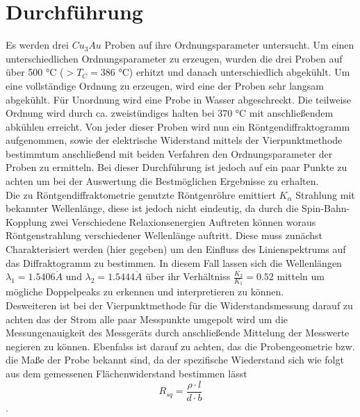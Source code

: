 \section{Durchführung}
    Es werden drei $Cu_3Au$ Proben auf ihre Ordnungsparameter untersucht. Um einen unterschiedlichen
    Ordnungsparameter zu erzeugen, wurden die drei Proben auf über 500 °C ($>T_C = 386 $ °C) erhitzt
    und danach unterschiedlich abgekühlt. Um eine vollständige Ordnung zu erzeugen, wird eine der
    Proben sehr langsam abgekühlt. Für Unordnung wird eine Probe in Wasser abgeschreckt.
    Die teilweise Ordnung wird durch ca. zweistündiges halten bei 370 °C mit anschließendem abkühlen
    erreicht. Von jeder dieser Proben wird nun ein Röntgendiffraktogramm aufgenommen,
    sowie der elektrische Widerstand mittels der Vierpunktmethode bestimmtum anschließend mit beiden Verfahren den
    Ordnungsparameter der Proben zu ermitteln.
    Bei dieser Durchführung ist jedoch auf ein paar Punkte zu achten um bei der Auswertung die Bestmöglichen
    Ergebnisse zu erhalten.\\
    Die zu Röntgendiffraktometrie genutzte Röntgenröhre emittiert $K_{\alpha}$ Strahlung mit bekannter
    Wellenlänge, diese ist jedoch nicht eindeutig, da durch die Spin-Bahn-Kopplung zwei Verschiedene
    Relaxionsenergien Auftreten können woraus Röntgenstrahlung verschiedener Wellenlänge auftritt.
    Diese muss zunächst Charakterisiert werden (hier gegeben) um den Einfluss des Linienspektrums auf
    das Diffraktogramm zu bestimmen. In diesem Fall lassen sich die Wellenlängen $\lambda_1 = 1.5406\mathring{A}$
    und $\lambda_2 = 1.5444\mathring{A}$ über ihr Verhältniss $\frac{K_2}{K_1} = 0.52$ mitteln um mögliche Doppelpeaks
    zu erkennen und interpretieren zu können.\\
    Desweiteren ist bei der Vierpunktmethode für die Widerstandsmessung darauf zu achten das der Strom alle paar
    Messpunkte umgepolt wird um die Messungenauigkeit des Messgeräts durch anschließende Mittelung der 
    Messwerte negieren zu können. Ebenfalss ist darauf zu achten, das die Probengeometrie bzw. die Maße
    der Probe bekannt sind, da der spezifische Wiederstand sich wie folgt aus dem gemessenen Flächenwiderstand
    bestimmen lässt
    \begin{equation}
        R_{sq} = \frac{\rho \cdot l}{d\cdot b}
    \end{equation}.
